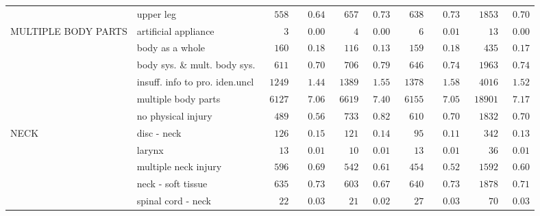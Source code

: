 \documentclass[9pt, oneside]{article}   	%
\begin{document}
\begin{longtable}{p{1.8in}p{2.2in}cccccccc}
 & upper leg  & $\phantom{00}558$ & $\phantom{00}0.64$ & $\phantom{00}657$ & $\phantom{0}0.73$ & $\phantom{00}638$ & $\phantom{00}0.73$ & $\phantom{00}1853$ & $\phantom{0}0.70$ \\
MULTIPLE BODY PARTS & artificial appliance  & $\phantom{0000}3$ & $\phantom{00}0.00$ & $\phantom{0000}4$ & $\phantom{0}0.00$ & $\phantom{0000}6$ & $\phantom{00}0.01$ & $\phantom{0000}13$ & $\phantom{0}0.00$ \\
 & body as a whole  & $\phantom{00}160$ & $\phantom{00}0.18$ & $\phantom{00}116$ & $\phantom{0}0.13$ & $\phantom{00}159$ & $\phantom{00}0.18$ & $\phantom{000}435$ & $\phantom{0}0.17$ \\
 & body sys. \& mult. body sys.  & $\phantom{00}611$ & $\phantom{00}0.70$ & $\phantom{00}706$ & $\phantom{0}0.79$ & $\phantom{00}646$ & $\phantom{00}0.74$ & $\phantom{00}1963$ & $\phantom{0}0.74$ \\
 & insuff. info to pro. iden.uncl  & $\phantom{0}1249$ & $\phantom{00}1.44$ & $\phantom{0}1389$ & $\phantom{0}1.55$ & $\phantom{0}1378$ & $\phantom{00}1.58$ & $\phantom{00}4016$ & $\phantom{0}1.52$ \\
 & multiple body parts  & $\phantom{0}6127$ & $\phantom{00}7.06$ & $\phantom{0}6619$ & $\phantom{0}7.40$ & $\phantom{0}6155$ & $\phantom{00}7.05$ & $\phantom{0}18901$ & $\phantom{0}7.17$ \\
 & no physical injury  & $\phantom{00}489$ & $\phantom{00}0.56$ & $\phantom{00}733$ & $\phantom{0}0.82$ & $\phantom{00}610$ & $\phantom{00}0.70$ & $\phantom{00}1832$ & $\phantom{0}0.70$ \\
NECK & disc - neck  & $\phantom{00}126$ & $\phantom{00}0.15$ & $\phantom{00}121$ & $\phantom{0}0.14$ & $\phantom{000}95$ & $\phantom{00}0.11$ & $\phantom{000}342$ & $\phantom{0}0.13$ \\
 & larynx  & $\phantom{000}13$ & $\phantom{00}0.01$ & $\phantom{000}10$ & $\phantom{0}0.01$ & $\phantom{000}13$ & $\phantom{00}0.01$ & $\phantom{0000}36$ & $\phantom{0}0.01$ \\
 & multiple neck injury  & $\phantom{00}596$ & $\phantom{00}0.69$ & $\phantom{00}542$ & $\phantom{0}0.61$ & $\phantom{00}454$ & $\phantom{00}0.52$ & $\phantom{00}1592$ & $\phantom{0}0.60$ \\
 & neck - soft tissue  & $\phantom{00}635$ & $\phantom{00}0.73$ & $\phantom{00}603$ & $\phantom{0}0.67$ & $\phantom{00}640$ & $\phantom{00}0.73$ & $\phantom{00}1878$ & $\phantom{0}0.71$ \\
 & spinal cord - neck  & $\phantom{000}22$ & $\phantom{00}0.03$ & $\phantom{000}21$ & $\phantom{0}0.02$ & $\phantom{000}27$ & $\phantom{00}0.03$ & $\phantom{0000}70$ & $\phantom{0}0.03$ \\

\end{longtable}
\end{document}
